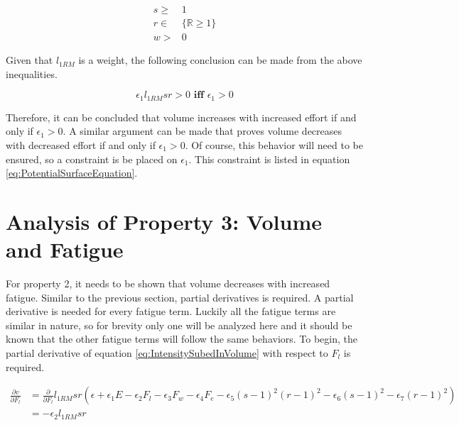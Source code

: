 \begin{equation*}
    \begin{split}
        s \ge & 1 \\
        r \in & \{ \mathbb{R}\ge 1 \} \\
        w > & 0
    \end{split}
\end{equation*}

Given that $l_{1RM}$ is a weight, the following conclusion can be made from the above inequalities.

\begin{equation*}
    \epsilon_1 l_{1RM} sr> 0 \textbf{ iff } \epsilon_1> 0
\end{equation*}

Therefore, it can be concluded that volume increases with increased effort if and only if $\epsilon_1> 0$. A similar argument can be made that proves volume decreases with decreased effort if and only if $\epsilon_1> 0$. Of course, this behavior will need to be ensured, so a constraint is be placed on $\epsilon_1$. This constraint is listed in equation \ref{eq:PotentialSurfaceEquation}.

\section{Analysis of Property 3: Volume and Fatigue}
\label{sec:PotentialSurfaceAnalysisOfProperty3}

For property 2, it needs to be shown that volume decreases with increased fatigue. Similar to the previous section, partial derivatives is required. A partial derivative is needed for every fatigue term. Luckily all the fatigue terms are similar in nature, so for brevity only one will be analyzed here and it should be known that the other fatigue terms will follow the same behaviors. To begin, the partial derivative of equation \ref{eq:IntensitySubedInVolume} with respect to $F_l$ is required.

\begin{equation*}
    \begin{split}
    		\frac{\partial v}{\partial F_l} & =
    		\frac{\partial}{\partial F_l} l_{1RM} sr\left( 
    			\epsilon+
    			\epsilon_1 E-
    			\epsilon_2 F_l-
    			\epsilon_3 F_w-
    			\epsilon_4 F_e-
    			\epsilon_5(s-1)^2(r-1)^2-
    			\epsilon_6(s-1)^2-
    			\epsilon_7(r-1)^2
    		\right) \\
    		& = -\epsilon_2 l_{1RM} sr
    \end{split}
\end{equation*}

